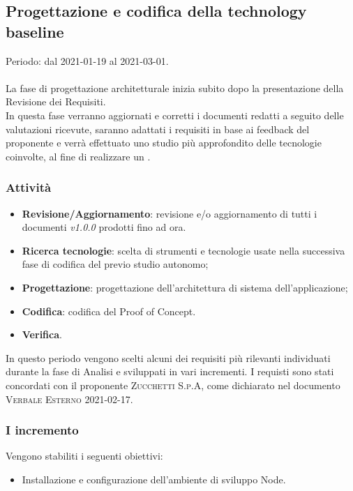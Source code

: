 \documentclass[../piano_di_progetto.tex]{subfiles}
\begin{document}
\subsection{Progettazione e codifica della technology baseline}
\label{sub:tech_baseline}
Periodo: dal 2021-01-19 al 2021-03-01. \\ \\
La fase di progettazione architetturale inizia subito dopo la presentazione della Revisione dei Requisiti.\\
In questa fase verranno aggiornati e corretti i documenti redatti a seguito delle valutazioni ricevute, saranno adattati i requisiti in base ai feedback del proponente e verrà effettuato uno studio più approfondito delle tecnologie coinvolte, al fine di realizzare un .

\subsubsection{Attività}
\begin{itemize}
    \item \textbf{Revisione/Aggiornamento}: revisione e/o aggiornamento di tutti i documenti \emph{v1.0.0} prodotti fino ad ora.
    \item \textbf{Ricerca tecnologie}: scelta di strumenti e tecnologie usate nella successiva fase di codifica del  previo studio autonomo;
    \item \textbf{Progettazione}: progettazione dell'architettura di sistema dell'applicazione;
    \item \textbf{Codifica}: codifica del Proof of Concept. 
    \item \textbf{Verifica}.\\
\end{itemize}
In questo periodo vengono scelti alcuni dei requisiti più rilevanti individuati durante la fase di Analisi e sviluppati in vari incrementi.
I requisti sono stati concordati con il proponente \textsc{Zucchetti S.p.A}, come dichiarato nel documento \textsc{Verbale Esterno 2021-02-17}.%

\subsubsection{I incremento}
Vengono stabiliti i seguenti obiettivi:
\begin{itemize}
    \item Installazione e configurazione dell'ambiente di sviluppo Node.
\end{itemize}
\end{document}

